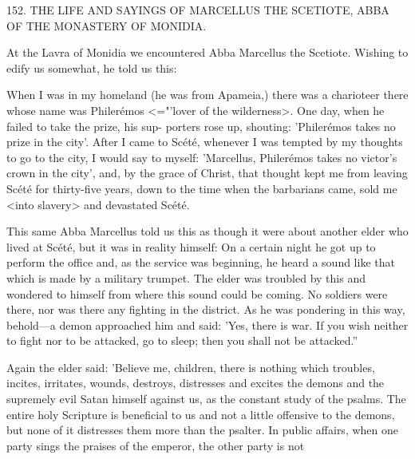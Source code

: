 152.
THE LIFE AND SAYINGS OF MARCELLUS
THE SCETIOTE, ABBA OF THE
MONASTERY OF MONIDIA.

At the Lavra of Monidia we encountered Abba Marcellus the
Scetiote.
Wishing to edify us somewhat, he told us this:

When I was in my homeland (he was from Apameia,) there was a
charioteer there whose name was Philerémos <="'lover of the
wilderness>.
One day, when he failed to take the prize, his sup-
porters rose up, shouting: 'Philerémos takes no prize in the city'.
After I came to Scété, whenever I was tempted by my thoughts to
go to the city, I would say to myself: 'Marcellus, Philerémos takes
no victor's crown in the city', and, by the grace of Christ, that
thought kept me from leaving Scété for thirty-five years, down to
the time when the barbarians came, sold me <into slavery> and
devastated Scété.

This same Abba Marcellus told us this as though it were about
another elder who lived at Scété, but it was in reality himself: On a
certain night he got up to perform the office and, as the service was
beginning, he heard a sound like that which is made by a military
trumpet.
The elder was troubled by this and wondered to himself
from where this sound could be coming.
No soldiers were there, nor
was there any fighting in the district.
As he was pondering in this
way, behold—a demon approached him and said: 'Yes, there is war.
If you wish neither to fight nor to be attacked, go to sleep; then you
shall not be attacked.”

Again the elder said: 'Believe me, children, there is nothing
which troubles, incites, irritates, wounds, destroys, distresses and
excites the demons and the supremely evil Satan himself against us,
as the constant study of the psalms.
The entire holy Scripture is
beneficial to us and not a little offensive to the demons, but none of
it distresses them more than the psalter.
In public affairs, when one
party sings the praises of the emperor, the other party is not

